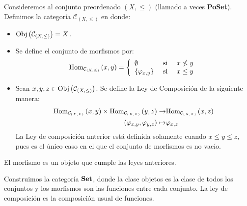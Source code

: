 \documentclass[12pt]{report}
\theoremstyle{largebreak}
\newcommand{\Obj}[1]{\ensuremath{\textup{Obj}\left(#1\right)}}
\newcommand{\Hom}[3]{\ensuremath{\textup{Hom}_{#1}\left(#2,#3\right)}}
\newcommand{\Cat}[1]{\ensuremath{\textup{\textbf{#1}}}}
\begin{document}
    \begin{exa}
        Consideremos al conjunto preordenado $(X,\leq)$ (llamado a veces \textbf{PoSet}). Definimos la categoría $\mathcal{C}_{(X,\leq)}$ en donde:
        \begin{itemize}
            \item $\Obj{\mathcal{C}_{(X,\leq)}}=X$.
            \item Se define el conjunto de morfismos por:
            \begin{equation*}
                \Hom{\mathcal{C}_{(X,\leq)}}{x}{y}=\left\{
                    \begin{array}{lcr}
                        \emptyset & \textup{ si } & x\nleq y\\
                        \left\{\varphi_{x,y} \right\} & \textup{ si } & x\leq y\\
                    \end{array}
                \right.
            \end{equation*}
            \item Sean $x,y,z\in \Obj{\mathcal{C}_{(X,\leq)}}$. Se define la Ley de Composición de la siguiente manera:
            \begin{equation*}
                \begin{split}
                    \Hom{\mathcal{C}_{(X,\leq)}}{x}{y}\times\Hom{\mathcal{C}_{(X,\leq)}}{y}{z}\rightarrow&\Hom{\mathcal{C}_{(X,\leq)}}{x}{z}\\
                    (\varphi_{x,y},\varphi_{y,z})\mapsto&\varphi_{x,z}\\
                \end{split}
            \end{equation*}
            La Ley de composición anterior está definida solamente cuando $x\leq y\leq z$, pues es el único caso en el que el conjunto de morfismos es no vacío.
        \end{itemize}

        El morfismo es un objeto que cumple las leyes anteriores.
    \end{exa}
    
    \begin{exa}
        Construimos la categoría $\Cat{Set}$, donde la clase objetos es la clase de todos los conjuntos y los morfismos son las funciones entre cada conjunto. La ley de composición es la composición usual de funciones.
    \end{exa}
\end{document}
